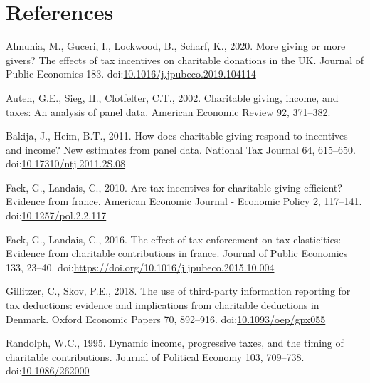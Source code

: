 \documentclass[
  11pt,
  a4paper,
]{article}
\newlength{\cslhangindent}
\newlength{\cslentryspacingunit} %
\newenvironment{CSLReferences}[2] %
 {%
  \setlength{\parindent}{0pt}
  \ifodd #1
  \let\oldpar\par
  \def\par{\hangindent=\cslhangindent\oldpar}
  \fi
  \setlength{\parskip}{#2\cslentryspacingunit}
 }%
 {}
\begin{document}
\clearpage

\hypertarget{references}{%
\section*{References}\label{references}}

\hypertarget{refs}{}
\begin{CSLReferences}{1}{0}
\leavevmode{}%
Almunia, M., Guceri, I., Lockwood, B., Scharf, K., 2020. More giving or more givers? The effects of tax incentives on charitable donations in the UK. Journal of Public Economics 183. doi:\href{https://doi.org/10.1016/j.jpubeco.2019.104114}{10.1016/j.jpubeco.2019.104114}

\leavevmode{}%
Auten, G.E., Sieg, H., Clotfelter, C.T., 2002. Charitable giving, income, and taxes: An analysis of panel data. American Economic Review 92, 371--382.

\leavevmode{}%
Bakija, J., Heim, B.T., 2011. How does charitable giving respond to incentives and income? New estimates from panel data. National Tax Journal 64, 615--650. doi:\href{https://doi.org/10.17310/ntj.2011.2S.08}{10.17310/ntj.2011.2S.08}

\leavevmode{}%
Fack, G., Landais, C., 2010. Are tax incentives for charitable giving efficient? Evidence from france. American Economic Journal - Economic Policy 2, 117--141. doi:\href{https://doi.org/10.1257/pol.2.2.117}{10.1257/pol.2.2.117}

\leavevmode{}%
Fack, G., Landais, C., 2016. The effect of tax enforcement on tax elasticities: Evidence from charitable contributions in france. Journal of Public Economics 133, 23--40. doi:\url{https://doi.org/10.1016/j.jpubeco.2015.10.004}

\leavevmode{}%
Gillitzer, C., Skov, P.E., 2018. {The use of third-party information reporting for tax deductions: evidence and implications from charitable deductions in Denmark}. Oxford Economic Papers 70, 892--916. doi:\href{https://doi.org/10.1093/oep/gpx055}{10.1093/oep/gpx055}

\leavevmode{}%
Randolph, W.C., 1995. Dynamic income, progressive taxes, and the timing of charitable contributions. Journal of Political Economy 103, 709--738. doi:\href{https://doi.org/10.1086/262000}{10.1086/262000}


\end{CSLReferences}
\end{document}
